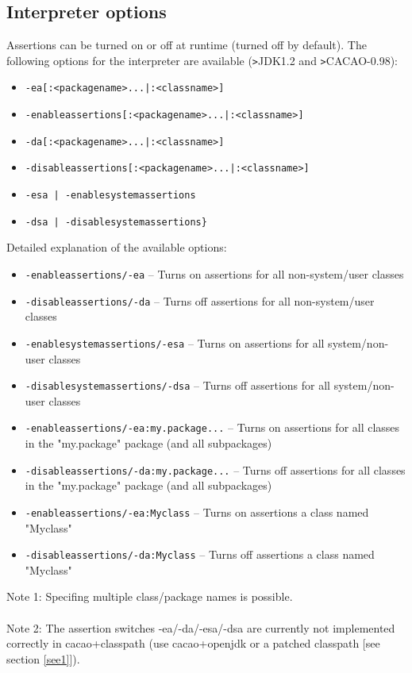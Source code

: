 \documentclass{article}%
\begin{document}
\pagebreak
\subsection{Interpreter options}
Assertions can be turned on or off at runtime (turned off by default). The following options for the interpreter are available (\verb'>'JDK1.2 and \verb'>'CACAO-0.98):
\begin{itemize}
\item \verb'-ea[:<packagename>...|:<classname>]'
\item \verb'-enableassertions[:<packagename>...|:<classname>]'
\item \verb'-da[:<packagename>...|:<classname>]'
\item \verb'-disableassertions[:<packagename>...|:<classname>]'
\item \verb'-esa | -enablesystemassertions'
\item \verb'-dsa | -disablesystemassertions}' 
\end{itemize}
Detailed explanation of the available options:
\begin{itemize}
\item{\verb'-enableassertions/-ea' -- \tiny{Turns on assertions for all non-system/user classes}}
\item{\verb'-disableassertions/-da' -- \tiny{Turns off assertions for all non-system/user classes}}
\item{\verb'-enablesystemassertions/-esa' -- \tiny{Turns on assertions for all system/non-user classes}}
\item{\verb'-disablesystemassertions/-dsa' -- \tiny{Turns off assertions for all system/non-user classes}}
\item{\verb'-enableassertions/-ea:my.package...' -- \tiny{Turns on assertions for all classes in the "my.package" package (and all subpackages)}}
\item{\verb'-disableassertions/-da:my.package...' -- \tiny{Turns off assertions for all classes in the "my.package" package (and all subpackages)}}
\item{\verb'-enableassertions/-ea:Myclass' -- \tiny{Turns on assertions a class named "Myclass"}}
\item{\verb'-disableassertions/-da:Myclass' -- \tiny{Turns off assertions a class named "Myclass"}}
\end{itemize}
Note 1: Specifing multiple class/package names is possible.
\\
\\
Note 2: The assertion switches -ea/-da/-esa/-dsa are currently not implemented correctly in cacao+classpath (use cacao+openjdk or a patched classpath [see section \ref{see1}]).
\pagebreak
\end{document}
